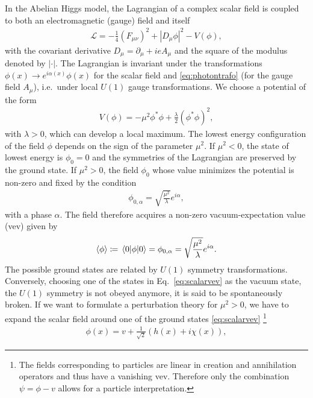 In the Abelian Higgs model, the Lagrangian of a complex scalar field is coupled to both an electromagnetic (gauge) field and itself 
\begin{align}\label{eq:sclag}
  \mathcal{L} = -\frac{1}{4}(F_{\mu\nu})^2+|D_\mu \phi|^2 - V(\phi),
\end{align}
with the covariant derivative $D_\mu = \partial_\mu + i e A_\mu$ and
the square of the modulus denoted by $|\cdot|$. The
Lagrangian is invariant under the transformations $\phi(x) \rightarrow
e^{i\alpha(x)} \phi(x)$ for the scalar field and
\eqref{eq:photontrafo} (for the gauge field $A_\mu$), i.e.\ under local $U(1)$ gauge
transformations. We choose a potential of the form 
\begin{align}\label{eq:scpot}
  V(\phi) = -\mu^2\phi^*\phi+\frac{\lambda}{2}(\phi^*\phi)^2,
\end{align}
with $\lambda >0$, which can develop a
local maximum. The lowest energy configuration of the field $\phi$ depends on the
sign of the parameter $\mu^2$. If $\mu^2<0$, the state of lowest energy is $\phi_0=0$
and the symmetries of the Lagrangian are preserved by the ground state. 
If $\mu^2>0$, the field $\phi_0$ whose value
minimizes the potential is non-zero and fixed by the condition
\begin{align}\label{eq:alphah}
  \phi_{0,\alpha} = \sqrt{\frac{\mu^2}{\lambda}}e^{i\alpha},
\end{align}
with a phase $\alpha$. The field therefore acquires a non-zero vacuum-expectation value
(vev) given by
\begin{align}\label{eq:scalarvev}
  \expval{\phi}\coloneqq\expval{\phi}{0} = \phi_{0,\alpha} = \sqrt{\frac{\mu^2}{\lambda}}e^{i\alpha}.
\end{align}
The possible ground states are related by $U(1)$ symmetry
transformations. Conversely, choosing one of the states in Eq.~\eqref{eq:scalarvev}
as the vacuum state, the $U(1)$ symmetry is not obeyed anymore, it is said to be spontaneously
broken. If we want to formulate a perturbation theory for $\mu^2>0$,
we have to expand the scalar field around one of the ground states
\eqref{eq:scalarvev} \footnote{The fields corresponding to particles
  are linear in
  creation and annihilation operators and thus have a vanishing vev. Therefore
  only the combination $\psi = \phi-v$ allows for a particle interpretation.}
\begin{align}
  \phi(x) = v + \frac{1}{\sqrt{2}}\left(h(x)+i\chi(x)\right),
\end{align}
